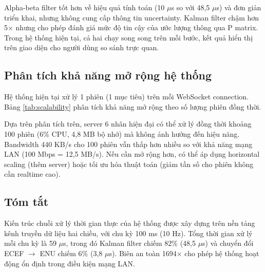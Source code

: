 Alpha-beta filter tốt hơn về hiệu quả tính toán (10 $\mu$s so với 48,5 $\mu$s) và đơn giản triển khai, nhưng không cung cấp thông tin uncertainty. Kalman filter chậm hơn 5$\times$ nhưng cho phép đánh giá mức độ tin cậy của ước lượng thông qua P matrix. Trong hệ thống hiện tại, cả hai chạy song song trên mỗi bước, kết quả hiển thị trên giao diện cho người dùng so sánh trực quan.

\subsection{Phân tích khả năng mở rộng hệ thống}

\hspace{0.5cm} Hệ thống hiện tại xử lý 1 phiên (1 mục tiêu) trên mỗi WebSocket connection. Bảng \ref{tab:scalability} phân tích khả năng mở rộng theo số lượng phiên đồng thời.

\begin{table}[H]
\centering
{}
\caption{Khả năng mở rộng theo số phiên đồng thời}
\label{tab:scalability}
\end{table}

Dựa trên phân tích trên, server 6 nhân hiện đại có thể xử lý đồng thời khoảng 100 phiên (6\% CPU, 4,8 MB bộ nhớ) mà không ảnh hưởng đến hiệu năng. Bandwidth 440 KB/s cho 100 phiên vẫn thấp hơn nhiều so với khả năng mạng LAN (100 Mbps = 12,5 MB/s). Nếu cần mở rộng hơn, có thể áp dụng horizontal scaling (thêm server) hoặc tối ưu hóa thuật toán (giảm tần số cho phiên không cần realtime cao).

\subsection{Tóm tắt}

\hspace{0.5cm} Kiến trúc chuỗi xử lý thời gian thực của hệ thống được xây dựng trên nền tảng kênh truyền dữ liệu hai chiều, với chu kỳ 100 ms (10 Hz). Tổng thời gian xử lý mỗi chu kỳ là 59 $\mu$s, trong đó Kalman filter chiếm 82\% (48,5 $\mu$s) và chuyển đổi ECEF $\to$ ENU chiếm 6\% (3,8 $\mu$s). Biên an toàn 1694$\times$ cho phép hệ thống hoạt động ổn định trong điều kiện mạng LAN.

